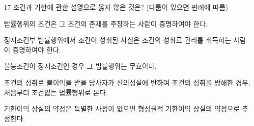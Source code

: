 \begin{question}{17}
조건과 기한에 관한 설명으로 옳지 않은 것은? (다툼이 있으면 판례에 따름)
\begin{choices}
  \item 법률행위의 조건은 그 조건의 존재를 주장하는 사람이 증명하여야 한다.
  \item 정지조건부 법률행위에서 조건이 성취된 사실은 조건의 성취로 권리를 취득하는 사람이 증명하여야 한다.
  \item 불능조건이 정지조건인 경우 그 법률행위는 무효이다.
  \item 조건의 성취로 불이익을 받을 당사자가 신의성실에 반하여 조건의 성취를 방해한 경우, 처음부터 조건없는 법률행위로 본다.
  \item 기한이익 상실의 약정은 특별한 사정이 없으면 형성권적 기한이익 상실의 약정으로 추정한다.
\end{choices}
\end{question}
